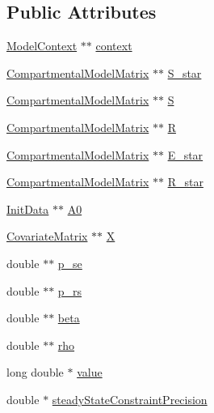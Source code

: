 \subsection*{Public Attributes}
\begin{DoxyCompactItemize}
\item 
\hyperlink{classSpatialSEIR_1_1ModelContext}{Model\-Context} $\ast$$\ast$ \hyperlink{classSpatialSEIR_1_1FC__S__Star_a5b90884aaea81dcdd1828b01c06b3e43}{context}
\item 
\hyperlink{classSpatialSEIR_1_1CompartmentalModelMatrix}{Compartmental\-Model\-Matrix} $\ast$$\ast$ \hyperlink{classSpatialSEIR_1_1FC__S__Star_ae7955695f611091c04fcc01d721d6225}{S\-\_\-star}
\item 
\hyperlink{classSpatialSEIR_1_1CompartmentalModelMatrix}{Compartmental\-Model\-Matrix} $\ast$$\ast$ \hyperlink{classSpatialSEIR_1_1FC__S__Star_ad49b3322944c04467da8f9a50bfe8554}{S}
\item 
\hyperlink{classSpatialSEIR_1_1CompartmentalModelMatrix}{Compartmental\-Model\-Matrix} $\ast$$\ast$ \hyperlink{classSpatialSEIR_1_1FC__S__Star_a0fb9730dc4cfdcaeaf8dd7f1254d2e93}{R}
\item 
\hyperlink{classSpatialSEIR_1_1CompartmentalModelMatrix}{Compartmental\-Model\-Matrix} $\ast$$\ast$ \hyperlink{classSpatialSEIR_1_1FC__S__Star_a98b5975a91f1e27f089a19910bf030ee}{E\-\_\-star}
\item 
\hyperlink{classSpatialSEIR_1_1CompartmentalModelMatrix}{Compartmental\-Model\-Matrix} $\ast$$\ast$ \hyperlink{classSpatialSEIR_1_1FC__S__Star_a3b09aa8e732a12af5bbae9c0c48da242}{R\-\_\-star}
\item 
\hyperlink{classSpatialSEIR_1_1InitData}{Init\-Data} $\ast$$\ast$ \hyperlink{classSpatialSEIR_1_1FC__S__Star_adb3257cc96f16d56589ad96cc74d0ab7}{A0}
\item 
\hyperlink{classSpatialSEIR_1_1CovariateMatrix}{Covariate\-Matrix} $\ast$$\ast$ \hyperlink{classSpatialSEIR_1_1FC__S__Star_a46f078abec44ca9708b65a8ab402ddb7}{X}
\item 
double $\ast$$\ast$ \hyperlink{classSpatialSEIR_1_1FC__S__Star_aed0125c2ef3ac758f046b7b8dea44697}{p\-\_\-se}
\item 
double $\ast$$\ast$ \hyperlink{classSpatialSEIR_1_1FC__S__Star_afa71439e5a1928e50266d7f8b066bd88}{p\-\_\-rs}
\item 
double $\ast$$\ast$ \hyperlink{classSpatialSEIR_1_1FC__S__Star_a1a588918ec2011729fde87d46cbc22ec}{beta}
\item 
double $\ast$$\ast$ \hyperlink{classSpatialSEIR_1_1FC__S__Star_a7477bcae8127617f68b081e8ccb2a38b}{rho}
\item 
long double $\ast$ \hyperlink{classSpatialSEIR_1_1FC__S__Star_a92c36f1dc6a099c072ffe591c3ceac2c}{value}
\item 
double $\ast$ \hyperlink{classSpatialSEIR_1_1FC__S__Star_ad49895014dd714807c7fb4b3fe6b86cc}{steady\-State\-Constraint\-Precision}
\end{DoxyCompactItemize}


